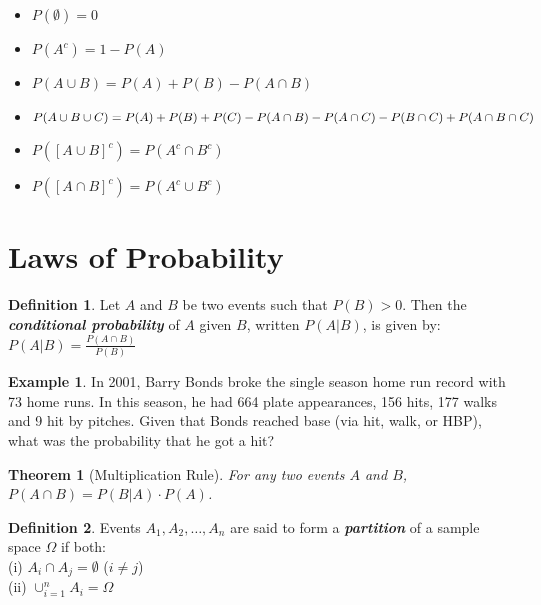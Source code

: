 \documentclass[
  11pt,
]{book}
\newtheorem{theorem}{Theorem}[chapter]
\theoremstyle{definition}
\newtheorem{definition}{Definition}[chapter]
\theoremstyle{definition}
\newtheorem{example}{Example}[chapter]
\theoremstyle{definition}
\theoremstyle{definition}
\theoremstyle{remark}
\begin{document}
\begin{itemize}
\item
  \(P(\emptyset) = 0\)\\
\item
  \(P(A^c) = 1 - P(A)\)
\item
  \(P(A \cup B) = P(A) + P(B) - P(A \cap B)\)
\item
  \(P(A \cup B \cup C) = \\ P(A) + P(B) + P(C) - P(A \cap B) - P(A \cap C) - P(B \cap C) + P(A \cap B \cap C)\)
\item
  \(P([A \cup B]^c) = P(A^c \cap B^c)\)
\item
  \(P([A \cap B]^c) = P(A^c \cup B^c)\)
\end{itemize}

\hypertarget{laws-of-probability}{%
\section{Laws of Probability}\label{laws-of-probability}}

\begin{definition}
Let \(A\) and \(B\) be two events such that \(P(B)>0\). Then the \textbf{\emph{conditional probability}} of \(A\) given \(B\), written \(P(A|B)\), is given by:
\(P(A|B) = \frac{P(A \cap B)}{P(B)}\)
\end{definition}

\begin{example}
In 2001, Barry Bonds broke the single season home run record with 73 home runs. In this season, he had 664 plate appearances, 156 hits, 177 walks and 9 hit by pitches. Given that Bonds reached base (via hit, walk, or HBP), what was the probability that he got a hit?
\end{example}

\hfill\break
\hfill\break
\hfill\break

\begin{theorem}[Multiplication Rule]
For any two events \(A\) and \(B\), \(P(A \cap B) = P(B|A) \cdot P(A)\).
\end{theorem}

\begin{definition}
Events \(A_1, A_2, \ldots, A_n\) are said to form a \textbf{\emph{partition}} of a sample space \(\Omega\) if both:\\
(i) \(A_i \cap A_j = \emptyset\) (\(i \neq j\))\\
(ii) \(\cup_{i=1}^n A_i = \Omega\)\\
\end{definition}
\end{document}
